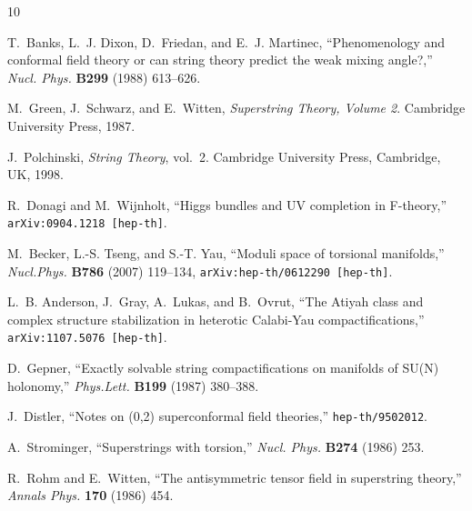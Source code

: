 \documentclass[11pt, a4paper]{article}
\begin{document}
%
%
%
%
%
\providecommand{\href}[2]{#2}\begingroup\raggedright\begin{thebibliography}{10}

T.~Banks, L.~J. Dixon, D.~Friedan, and E.~J. Martinec, ``{Phenomenology and
  conformal field theory or can string theory predict the weak mixing
  angle?},''
{\em Nucl. Phys.} {\bf B299} (1988)  613--626.

M.~Green, J.~Schwarz, and E.~Witten, {\em Superstring Theory, Volume 2}.
\newblock Cambridge University Press, 1987.

J.~Polchinski, {\em String Theory}, vol.~2.
\newblock Cambridge University Press, Cambridge, UK, 1998.

R.~Donagi and M.~Wijnholt, ``{Higgs bundles and UV completion in F-theory},''
  \href{http://arxiv.org/abs/0904.1218}{{\tt arXiv:0904.1218 [hep-th]}}.

M.~Becker, L.-S. Tseng, and S.-T. Yau, ``{Moduli space of torsional
  manifolds},'' \href{http://dx.doi.org/10.1016/j.nuclphysb.2007.07.006}{{\em
  Nucl.Phys.} {\bf B786} (2007)  119--134},
  \href{http://arxiv.org/abs/hep-th/0612290}{{\tt arXiv:hep-th/0612290
  [hep-th]}}.

L.~B. Anderson, J.~Gray, A.~Lukas, and B.~Ovrut, ``{The Atiyah class and
  complex structure stabilization in heterotic Calabi-Yau compactifications},''
  \href{http://arxiv.org/abs/1107.5076}{{\tt arXiv:1107.5076 [hep-th]}}.

D.~Gepner, ``{Exactly solvable string compactifications on manifolds of SU(N)
  holonomy},'' {\em Phys.Lett.} {\bf B199} (1987)  380--388.

J.~Distler, ``Notes on (0,2) superconformal field theories,''
\href{http://arxiv.org/abs/hep-th/9502012}{{\tt hep-th/9502012}}.

A.~Strominger, ``{Superstrings with torsion},''
{\em Nucl. Phys.} {\bf B274} (1986)  253.

R.~Rohm and E.~Witten, ``{The antisymmetric tensor field in superstring
  theory},'' \href{http://dx.doi.org/10.1016/0003-4916(86)90099-0}{{\em Annals
  Phys.} {\bf 170} (1986)  454}.


\end{thebibliography}
\end{document}
